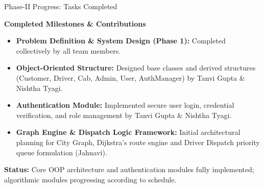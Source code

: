 \documentclass[aspectratio=169,11pt]{beamer}
\begin{document}
\begin{frame}{Phase-II Progress: Tasks Completed}

\footnotesize
\vspace{-2mm}
\textbf{\color{GEUBlue}Completed Milestones \& Contributions}
\vspace{1mm}

\begin{itemize}\itemsep2pt
\item \textbf{Problem Definition \& System Design (Phase 1):} Completed collectively by all team members.
\item \textbf{Object-Oriented Structure:} Designed base classes and derived structures (Customer, Driver, Cab, Admin, User, AuthManager) by Tanvi Gupta \& Nishtha Tyagi.
\item \textbf{Authentication Module:} Implemented secure user login, credential verification, and role management by Tanvi Gupta \& Nishtha Tyagi.
\item \textbf{Graph Engine \& Dispatch Logic Framework:} Initial architectural planning for City Graph, Dijkstra's route engine and Driver Dispatch priority queue formulation (Jahnavi).
\end{itemize}

\vspace{1mm}
\begin{center}
\colorbox{GEULightBlue}{%
\parbox{0.90\textwidth}{%
\centering
\scriptsize
\textbf{Status:} Core OOP architecture and authentication modules fully implemented; algorithmic modules progressing according to schedule.%
}}
\end{center}

\end{frame}
\end{document}
